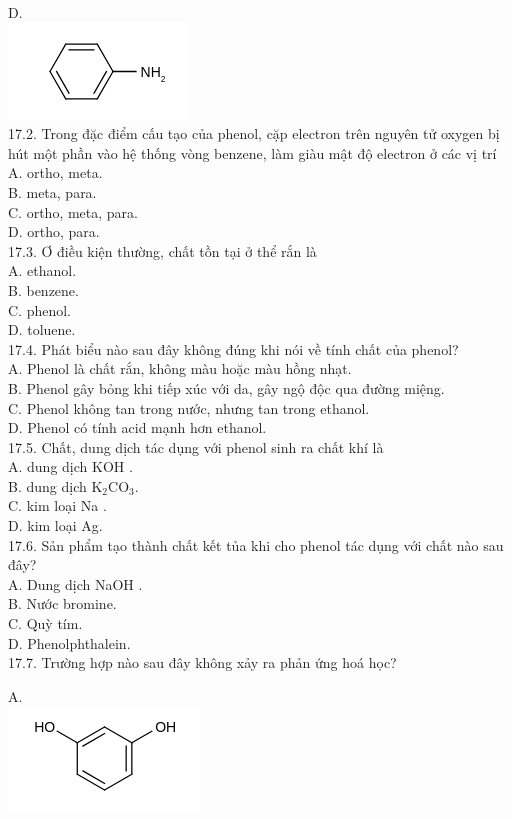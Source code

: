 \documentclass[10pt]{article}
\begin{document}
D.\\
\includegraphics{smile-15881ca49c612ffd3fe1b1eb3236902bc8edb07a}\\
17.2. Trong đặc điểm cấu tạo của phenol, cặp electron trên nguyên tử oxygen bị hút một phần vào hệ thống vòng benzene, làm giàu mật độ electron ở các vị trí\\
A. ortho, meta.\\
B. meta, para.\\
C. ortho, meta, para.\\
D. ortho, para.\\
17.3. Ơ điều kiện thường, chất tồn tại ở thể rắn là\\
A. ethanol.\\
B. benzene.\\
C. phenol.\\
D. toluene.\\
17.4. Phát biểu nào sau đây không đúng khi nói về tính chất của phenol?\\
A. Phenol là chất rắn, không màu hoặc màu hồng nhạt.\\
B. Phenol gây bỏng khi tiếp xúc với da, gây ngộ độc qua đường miệng.\\
C. Phenol không tan trong nước, nhưng tan trong ethanol.\\
D. Phenol có tính acid mạnh hơn ethanol.\\
17.5. Chất, dung dịch tác dụng với phenol sinh ra chất khí là\\
A. dung dịch KOH .\\
B. dung dịch $\mathrm{K}_{2} \mathrm{CO}_{3}$.\\
C. kim loại Na .\\
D. kim loại Ag.\\
17.6. Sản phẩm tạo thành chất kết tủa khi cho phenol tác dụng với chất nào sau đây?\\
A. Dung dịch NaOH .\\
B. Nước bromine.\\
C. Quỳ tím.\\
D. Phenolphthalein.\\
17.7. Trường hợp nào sau đây không xảy ra phản ứng hoá học?

A.\\
\includegraphics{smile-2d23e9ee391463ef689305903315c63197af3c53}
\end{document}
